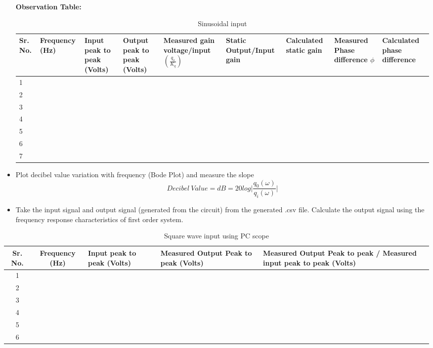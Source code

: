 \documentclass[9pt]{scrreprt}
\begin{document}
\begin{itemize}
\textbf{Observation Table:}

\begin{table}[H]
\centering
\caption{Sinusoidal input}
\begin{tabularx}{\textwidth}{|p{0.5cm}|X|X|X|X|X|X|X|X|}
\hline
\textbf{Sr. No.} & \textbf{Frequency (Hz)} & \textbf{Input peak to peak (Volts)} & \textbf{Output peak to peak (Volts)} & \textbf{Measured gain voltage/input} $\left( \frac{q_o}{K_q} \right)$ & \textbf{Static Output/Input gain} & \textbf{Calculated static gain} & \textbf{Measured Phase difference $\phi$} & \textbf{Calculated phase difference} \\
\hline
1 &  &  &  &  &  &  &  &  \\
\hline
2 &  &  &  &  &  &  &  &  \\
\hline
3 &  &  &  &  &  &  &  &  \\
\hline
4 &  &  &  &  &  &  &  &  \\
\hline
5 &  &  &  &  &  &  &  &  \\
\hline
6 &  &  &  &  &  &  &  &  \\
\hline
7 &  &  &  &  &  &  &  &  \\
\hline
\end{tabularx}
\label{tab:sine_input}
\end{table}

\item Plot decibel value variation with frequency (Bode Plot) and measure the slope
\begin{equation*}
Decibel~Value = dB = 20log\bigg\lvert\frac{q_0(\omega)}{q_i(\omega)}\bigg\rvert
\end{equation*}
\item Take the input signal and output signal (generated from the circuit) from the generated .csv file. Calculate the output signal using the frequency response characteristics of first order system.
\end{itemize}

\begin{table}[H]
\centering
\caption{Square wave input using PC scope}
\begin{tabularx}{\textwidth}{|c|c|X|X|X|}
\hline
\textbf{Sr. No.} & \textbf{Frequency (Hz)} & \textbf{Input peak to peak (Volts)} & \textbf{Measured Output Peak to peak (Volts)} & \textbf{Measured Output Peak to peak / Measured input peak to peak (Volts)} \\ \hline
1 &  &  &  &  \\ \hline
2 &  &  &  &  \\ \hline
3 &  &  &  &  \\ \hline
4 &  &  &  &  \\ \hline
5 &  &  &  &  \\ \hline
6 &  &  &  &  \\ \hline
\end{tabularx}
\end{table}
\end{document}
